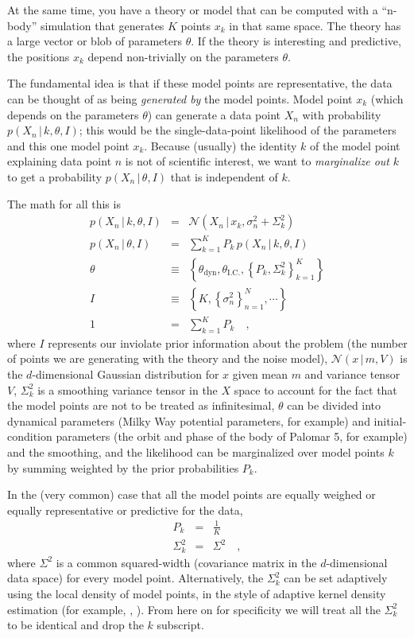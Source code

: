 \documentclass[12pt,pdftex,preprint]{aastex}
\newcommand{\setof}[1]{\left\{{#1}\right\}}
\newcommand{\given}{\,|\,}
\newcommand{\dyn}{\mathrm{dyn}}
\newcommand{\ic}{\mathrm{I.C.}}
\newcommand{\normal}{\mathscr{N}}
\begin{document}
At the same time, you have a theory or model that can be computed with
a ``n-body'' simulation that generates $K$ points $x_k$ in that same
space.  The theory has a large vector or blob of parameters $\theta$.
If the theory is interesting and predictive, the positions $x_k$
depend non-trivially on the parameters $\theta$.

The fundamental idea is that if these model points are representative,
the data can be thought of as being \emph{generated by} the model
points.  Model point $x_k$ (which depends on the parameters $\theta$)
can generate a data point $X_n$ with probability $p(X_n\given
k,\theta,I)$; this would be the single-data-point likelihood of the
parameters and this one model point $x_k$.  Because (usually) the
identity $k$ of the model point explaining data point $n$ is not of
scientific interest, we want to \emph{marginalize out} $k$ to get a
probability $p(X_n\given\theta,I)$ that is independent of $k$.

The math for all this is
\begin{eqnarray}
p(X_n\given k,\theta,I) &=& \normal(X_n\given x_k,\sigma^2_n+\Sigma_k^2)
\\
p(X_n\given\theta,I) &=& \sum_{k=1}^K P_k\,p(X_n\given k,\theta,I)
\\
\theta &\equiv& \setof{\theta_\dyn, \theta_\ic, \setof{P_k, \Sigma_k^2}_{k=1}^K }
\\
I &\equiv& \setof{K, \setof{\sigma^2_n}_{n=1}^N, \cdots}
\\
1 &=& \sum_{k=1}^K P_k
\quad ,
\end{eqnarray}
where $I$ represents our inviolate prior information about the problem
(the number of points we are generating with the theory and the noise
model), $\normal(x\given m, V)$ is the $d$-dimensional Gaussian
distribution for $x$ given mean $m$ and variance tensor $V$,
$\Sigma^2_k$ is a smoothing variance tensor in the $X$ space to
account for the fact that the model points are not to be treated as
infinitesimal, $\theta$ can be divided into dynamical parameters
(Milky Way potential parameters, for example) and initial-condition
parameters (the orbit and phase of the body of Palomar 5, for example)
and the smoothing, and the likelihood can be marginalized over model
points $k$ by summing weighted by the prior probabilities $P_k$.

In the (very common) case that all the model points are
equally weighed or equally representative or predictive for the data,
\begin{eqnarray}
P_k &=& \frac{1}{K}
\\
\Sigma^2_k &=& \Sigma^2
\quad ,
\end{eqnarray}
where $\Sigma^2$ is a common squared-width (covariance matrix in the
$d$-dimensional data space) for every model point.  Alternatively, the
$\Sigma^2_k$ can be set adaptively using the local density of model
points, in the style of adaptive kernel density estimation (for
example, \citealt{adaptiveKDE1}, \citealt{adaptiveKDE2}).  From here
on for specificity we will treat all the $\Sigma^2_k$ to be identical
and drop the $k$ subscript.
\end{document}
